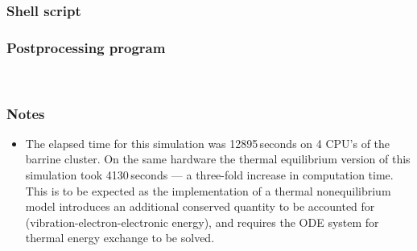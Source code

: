 \pagebreak
\subsubsection{Shell script}
\label{finite-cyl-sh-files-2T}
\topbar

\bottombar


\subsubsection{Postprocessing program}
\label{finite-cyl-post-files-2T}
\topbar

\bottombar\\
\topbar

\bottombar

\subsubsection{Notes}
\begin{itemize}
\item The elapsed time for this simulation was 12895\,seconds on 4 CPU's of the barrine cluster.
  On the same hardware the thermal equilibrium version of this simulation took 4130\,seconds --- 
  a three-fold increase in computation time.  This is to be expected as the implementation of a 
  thermal nonequilibrium model introduces an additional conserved quantity to be accounted for (vibration-electron-electronic energy), 
  and requires the ODE system for thermal energy exchange to be solved.
\end{itemize}

